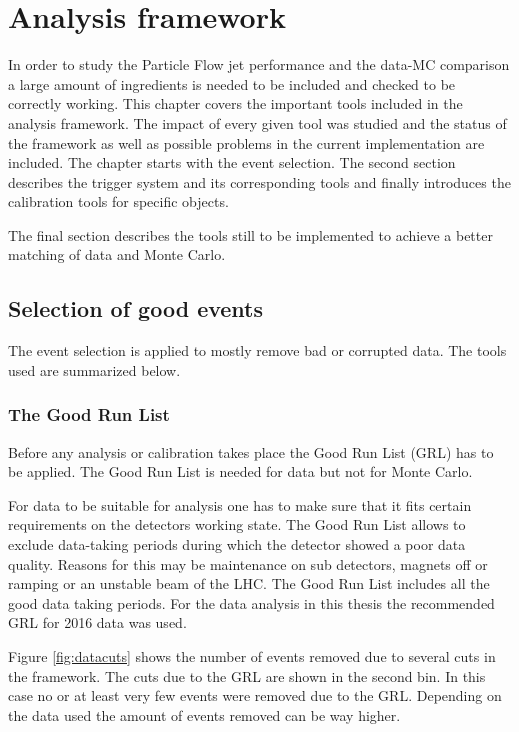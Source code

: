 \chapter{Analysis framework}

In order to study the Particle Flow jet performance and the data-MC comparison a large amount of ingredients is needed to be included and checked to be correctly working. This chapter covers the important tools included in the analysis framework. The impact of every given tool was studied and the status of the framework as well as possible problems in the current implementation are included.
The chapter starts with the event selection. The second section describes the trigger system and its corresponding tools and finally introduces the calibration tools for specific objects.

The final section describes the tools still to be implemented to achieve a better matching of data and Monte Carlo.




\section{Selection of good events}

The event selection is applied to mostly remove bad or corrupted data. The tools used are summarized below.

\subsection{The Good Run List}

Before any analysis or calibration takes place the Good Run List (GRL) has to be applied. The Good Run List is needed for data but not for Monte Carlo.

For data to be suitable for analysis one has to make sure that it fits certain requirements on the detectors working state. The Good Run List allows to exclude data-taking periods during which the detector showed a poor data quality. Reasons for this may be maintenance on sub detectors, magnets off or ramping or an unstable beam of the LHC.
The Good Run List includes all the good data taking periods.
For the data analysis in this thesis the recommended GRL for 2016 data was used.

Figure \ref{fig:datacuts} shows the number of events removed due to several cuts in the framework. The cuts due to the GRL are shown in the second bin. In this case no or at least very few events were removed due to the GRL. Depending on the data used the amount of events removed can be way higher.


